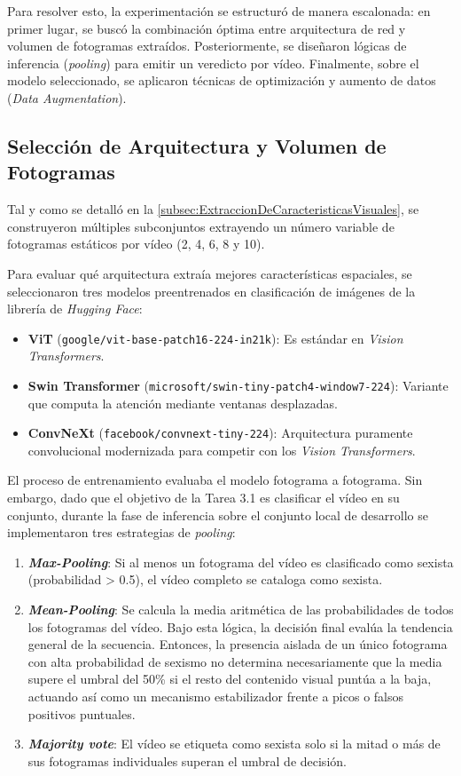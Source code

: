 Para resolver esto, la experimentación se estructuró de manera escalonada: en primer lugar, se buscó la combinación óptima entre arquitectura de red y volumen de fotogramas extraídos. Posteriormente, se diseñaron lógicas de inferencia (\textit{pooling}) para emitir un veredicto por vídeo. Finalmente, sobre el modelo seleccionado, se aplicaron técnicas de optimización y aumento de datos (\textit{Data Augmentation}).

\subsection{Selección de Arquitectura y Volumen de Fotogramas}
\label{subsec:SeleccionDeArquitecturaYVolumenDeFotogramas}
Tal y como se detalló en la \autoref{subsec:ExtraccionDeCaracteristicasVisuales}, se construyeron múltiples subconjuntos extrayendo un número variable de fotogramas estáticos por vídeo (2, 4, 6, 8 y 10).

Para evaluar qué arquitectura extraía mejores características espaciales, se seleccionaron tres modelos preentrenados en clasificación de imágenes de la librería de \textit{Hugging Face}:
\begin{itemize}
    \item \textbf{ViT} (\texttt{google/vit-base-patch16-224-in21k}): Es estándar en \textit{Vision Transformers}.
    \item \textbf{Swin Transformer} (\texttt{microsoft/swin-tiny-patch4-window7-224}): Variante que computa la atención mediante ventanas desplazadas.
    \item \textbf{ConvNeXt} (\texttt{facebook/convnext-tiny-224}): Arquitectura puramente convolucional modernizada para competir con los \textit{Vision Transformers}. 
\end{itemize}

El proceso de entrenamiento evaluaba el modelo fotograma a fotograma. Sin embargo, dado que el objetivo de la Tarea 3.1 es clasificar el vídeo en su conjunto, durante la fase de inferencia sobre el conjunto local de desarrollo se implementaron tres estrategias de \textit{pooling}:
\begin{enumerate}
    \item \textbf{\textit{Max-Pooling}}: Si al menos un fotograma del vídeo es clasificado como sexista (probabilidad > 0.5), el vídeo completo se cataloga como sexista.
    \item \textbf{\textit{Mean-Pooling}}: Se calcula la media aritmética de las probabilidades de todos los fotogramas del vídeo. Bajo esta lógica, la decisión final evalúa la tendencia general de la secuencia. Entonces, la presencia aislada de un único fotograma con alta probabilidad de sexismo no determina necesariamente que la media supere el umbral del 50\% si el resto del contenido visual puntúa a la baja, actuando así como un mecanismo estabilizador frente a picos o falsos positivos puntuales.
    \item \textbf{\textit{Majority vote}}: El vídeo se etiqueta como sexista solo si la mitad o más de sus fotogramas individuales superan el umbral de decisión. 
\end{enumerate}

